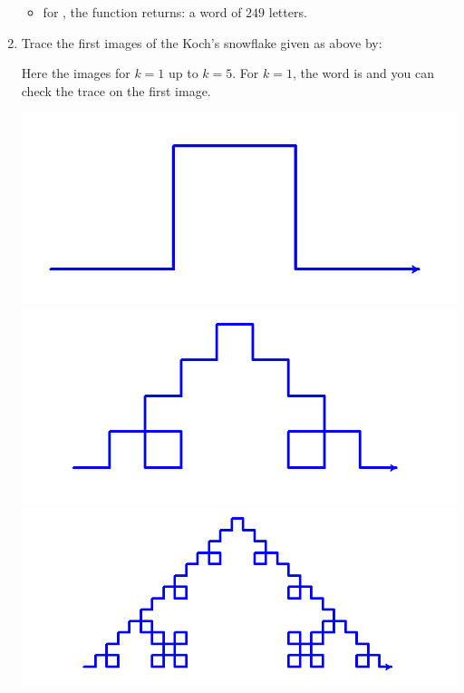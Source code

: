 \documentclass[11pt,class=report,crop=false]{standalone}
\begin{document}
\begin{activite}
\begin{enumerate}
\begin{itemize}
    \item for , the function returns:  a word of $249$ letters.
    
  \end{itemize}
  
  \item Trace the first images of the Koch's snowflake given as above by:  
  
  
  Here the images for $k=1$ up to $k=5$.
  For $k=1$, the word is  and you can check the trace on the first image.
  
\begin{center}
\includegraphics[scale=\myscale,scale=0.22]{screen-lsystems-3a}
\includegraphics[scale=\myscale,scale=0.22]{screen-lsystems-3b}
\includegraphics[scale=\myscale,scale=0.22]{screen-lsystems-3c}

\end{center}
\end{enumerate}
\end{activite}
\end{document}
